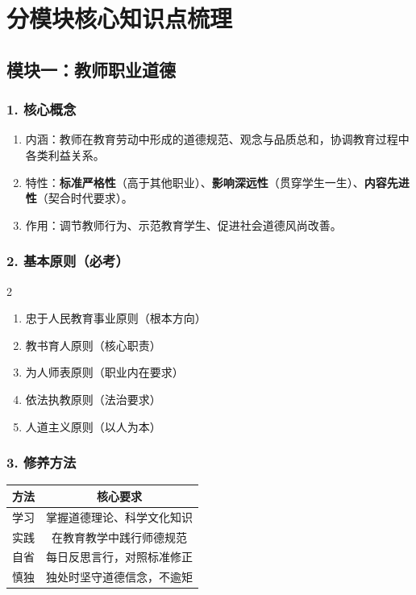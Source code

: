 \documentclass[12pt,a4paper]{article}
\begin{document}
\newpage

\section{分模块核心知识点梳理}
\subsection{模块一：教师职业道德}
\subsubsection{1. 核心概念}
\begin{enumerate}[label=1.,itemsep=0.3ex]
\item 内涵：教师在教育劳动中形成的道德规范、观念与品质总和，协调教育过程中各类利益关系。
\item 特性：\textbf{标准严格性}（高于其他职业）、\textbf{影响深远性}（贯穿学生一生）、\textbf{内容先进性}（契合时代要求）。
\item 作用：调节教师行为、示范教育学生、促进社会道德风尚改善。
\end{enumerate}

\subsubsection{2. 基本原则（必考）}
\begin{multicols}{2}
\begin{enumerate}[label=•,itemsep=0.5ex]
\item 忠于人民教育事业原则（根本方向）
\item 教书育人原则（核心职责）
\item 为人师表原则（职业内在要求）
\item 依法执教原则（法治要求）
\item 人道主义原则（以人为本）
\end{enumerate}
\end{multicols}

\subsubsection{3. 修养方法}
\begin{center}
\begin{tabular}{|c|c|}
\hline
\textbf{方法} & \textbf{核心要求} \\
\hline
学习 & 掌握道德理论、科学文化知识 \\
\hline
实践 & 在教育教学中践行师德规范 \\
\hline
自省 & 每日反思言行，对照标准修正 \\
\hline
慎独 & 独处时坚守道德信念，不逾矩 \\
\hline
\end{tabular}
\end{center}
\end{document}
